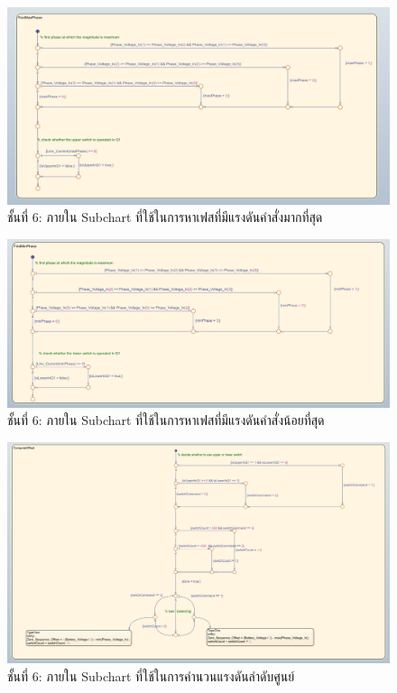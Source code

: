 \documentclass[11pt,a4paper]{article}
\begin{document}
\begin{figure}[H]
    \centering
    \includegraphics[width=\textwidth]{tam-fqt-l2-1.png}
    \caption{ชั้นที่ 6: ภายใน Subchart ที่ใช้ในการหาเฟสที่มีแรงดันคำสั่งมากที่สุด}
\end{figure}

\begin{figure}[H]
    \centering
    \includegraphics[width=\textwidth]{tam-fqt-l2-2.png}
    \caption{ชั้นที่ 6: ภายใน Subchart ที่ใช้ในการหาเฟสที่มีแรงดันคำสั่งน้อยที่สุด}
\end{figure}

\begin{figure}[H]
    \centering
    \includegraphics[width=\textwidth]{tam-fqt-l2-3.png}
    \caption{ชั้นที่ 6: ภายใน Subchart ที่ใช้ในการคำนวนแรงดันลำดับศูนย์}
\end{figure}
\end{document}
